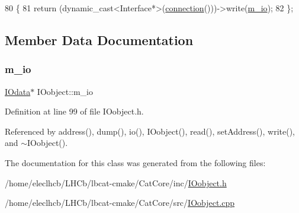 \begin{DoxyCode}
80                              \{
81     \textcolor{keywordflow}{return} (dynamic\_cast<Interface*>(\hyperlink{classElement_af57444353c1ddf9fa0109801e97debf7}{connection}()))->write(\hyperlink{classIOobject_aa648e4128c3c37d8291d6bb26b57c504}{m\_io});
82   \};
\end{DoxyCode}


\subsection{Member Data Documentation}
\mbox{\label{classIOobject_aa648e4128c3c37d8291d6bb26b57c504}} 
\subsubsection{\texorpdfstring{m\+\_\+io}{m\_io}}
{\footnotesize\ttfamily \hyperlink{classIOdata}{I\+Odata}$\ast$ I\+Oobject\+::m\+\_\+io\hspace{0.3cm}{\ttfamily [private]}}



Definition at line 99 of file I\+Oobject.\+h.



Referenced by address(), dump(), io(), I\+Oobject(), read(), set\+Address(), write(), and $\sim$\+I\+Oobject().



The documentation for this class was generated from the following files\+:\begin{DoxyCompactItemize}
\item 
/home/eleclhcb/\+L\+H\+Cb/lbcat-\/cmake/\+Cat\+Core/inc/\hyperlink{IOobject_8h}{I\+Oobject.\+h}\item 
/home/eleclhcb/\+L\+H\+Cb/lbcat-\/cmake/\+Cat\+Core/src/\hyperlink{IOobject_8cpp}{I\+Oobject.\+cpp}\end{DoxyCompactItemize}
